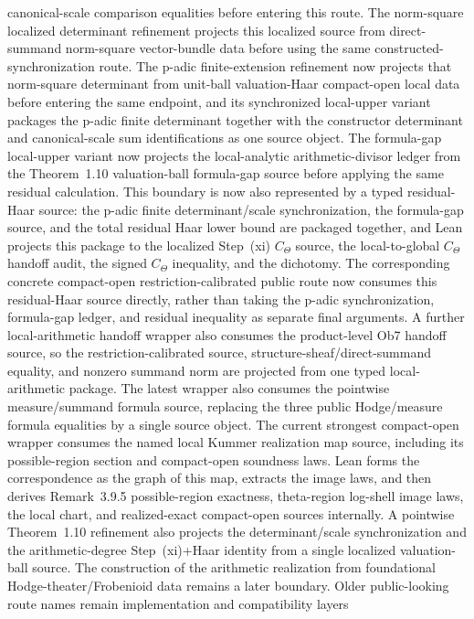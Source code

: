 \documentclass[11pt]{article}
\theoremstyle{plain}
\theoremstyle{definition}
\theoremstyle{remark}
\begin{document}
canonical-scale comparison equalities before entering this route.  The
norm-square localized determinant refinement projects this localized source
from direct-summand norm-square vector-bundle data before using the same
constructed-synchronization route.  The p-adic finite-extension refinement
now projects that norm-square determinant from unit-ball valuation-Haar
compact-open local data before entering the same endpoint, and its synchronized
local-upper variant packages the p-adic finite determinant together with the
constructor determinant and canonical-scale sum identifications as one source
object.  The formula-gap local-upper variant now projects the local-analytic
arithmetic-divisor ledger from the Theorem~1.10 valuation-ball formula-gap
source before applying the same residual calculation.  This boundary is now
also represented by a typed residual-Haar source: the p-adic finite
determinant/scale synchronization, the formula-gap source, and the total
residual Haar lower bound are packaged together, and Lean projects this package
to the localized Step~(xi) \(C_\Theta\) source, the local-to-global \(C_\Theta\)
handoff audit, the signed \(C_\Theta\) inequality, and the dichotomy.  The
corresponding concrete compact-open restriction-calibrated public route now
consumes this residual-Haar source directly, rather than taking the p-adic
synchronization, formula-gap ledger, and residual inequality as separate final
arguments.  A further local-arithmetic handoff wrapper also consumes the
product-level Ob7 handoff source, so the restriction-calibrated source,
structure-sheaf/direct-summand equality, and nonzero summand norm are projected
from one typed local-arithmetic package.  The latest wrapper also consumes the
pointwise measure/summand formula source, replacing the three public
Hodge/measure formula equalities by a single source object.  The current
strongest compact-open wrapper consumes the named local Kummer realization map
source, including its possible-region section and compact-open soundness laws.
Lean forms the correspondence as the graph of this map, extracts the image
laws, and then derives Remark~3.9.5 possible-region exactness,
theta-region log-shell image laws, the local chart, and realized-exact
compact-open sources internally.  A pointwise
Theorem~1.10 refinement also projects the
determinant/scale synchronization and the arithmetic-degree Step~(xi)+Haar
identity from a single localized valuation-ball source.  The
construction of the arithmetic realization from foundational
Hodge-theater/Frobenioid data remains a later boundary.
Older
public-looking route names remain implementation and compatibility layers
\end{document}
